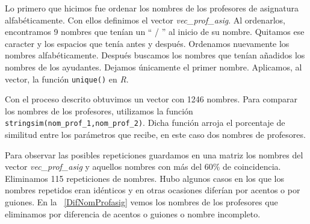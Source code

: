 Lo primero que hicimos fue ordenar los nombres de los profesores de asignatura alfabéticamente. Con ellos definimos el vector \textit{vec\_prof\_asig}. Al ordenarlos, encontramos 9 nombres que tenían un `` / '' al inicio de su nombre. Quitamos ese caracter y los espacios que tenía antes y después. Ordenamos nuevamente los nombres alfabéticamente. Después buscamos los nombres que tenían añadidos los nombres de los ayudantes. Dejamos únicamente el primer nombre. Aplicamos, al vector, la función \verb+unique()+ en \textit{R}.

Con el proceso descrito obtuvimos un vector con 1246 nombres. Para comparar los nombres de los profesores, utilizamos la función \verb+stringsim(nom_prof_1,nom_prof_2)+. Dicha función arroja el porcentaje de similitud entre los parámetros que recibe, en este caso dos nombres de profesores.

Para observar las posibles repeticiones guardamos en una matriz los nombres del vector \textit{vec\_prof\_asig} y aquellos nombres con más del $60\%$ de coincidencia. Eliminamos 115 repeticiones de nombres. Hubo algunos casos en los que los nombres repetidos eran idénticos y en otras ocasiones diferían por acentos o por guiones. En la \tablename{~\ref{DifNomProfasig}} vemos los nombres de los profesores que eliminamos por diferencia de acentos o guiones o nombre incompleto.

